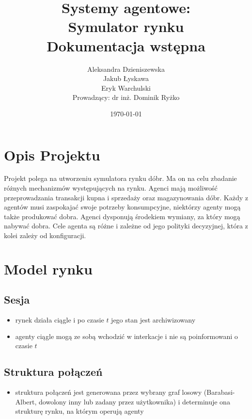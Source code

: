 \documentclass[]{article}
\date{}
\title{Systemy agentowe: \\ Symulator rynku \\ Dokumentacja wstępna}
\author{Aleksandra Dzieniszewska \\ Jakub Łyskawa \\ Eryk Warchulski \\ Prowadzący: dr inż. Dominik Ryżko}%
\date{\today}
\providecommand{\tightlist}{%
  \setlength{\itemsep}{0pt}\setlength{\parskip}{0pt}}
\begin{document}
\maketitle
\hypertarget{opis-projektu}{%
\section{Opis Projektu}\label{opis-projektu}}

Projekt polega na utworzeniu symulatora rynku dóbr. Ma on na celu
zbadanie różnych mechanizmów występujących na rynku. Agenci mają
możliwość przeprowadzania transakcji kupna i sprzedaży oraz
magazynowania dóbr. Każdy z agentów musi zaspokajać swoje potrzeby
konsumpcyjne, niektórzy agenty mogą także produkować dobra. Agenci
dysponują środekiem wymiany, za który mogą nabywać dobra. Cele agenta są
różne i zależne od jego polityki decyzyjnej, która z kolei zależy od
konfiguracji.

\hypertarget{model-rynku}{%
\section{Model rynku}\label{model-rynku}}

\hypertarget{sesja}{%
\subsection{Sesja}\label{sesja}}

\begin{itemize}
\tightlist
\item
  rynek działa ciągle i po czasie \(t\) jego stan jest archiwizowany
\item
  agenty ciągle mogą ze sobą wchodzić w interkacje i nie są
  poinformowani o czasie \(t\)
\end{itemize}

\hypertarget{struktura-poux142ux105czeux144}{%
\subsection{Struktura połączeń}\label{struktura-poux142ux105czeux144}}

\begin{itemize}
\tightlist
\item
  struktura połączeń jest generowana przez wybrany graf losowy
  (Barabasi-Albert, dowolony inny lub zadany przez użytkownika) i
  determinuje ona strukturę rynku, na którym operują agenty
\end{itemize}
\end{document}

